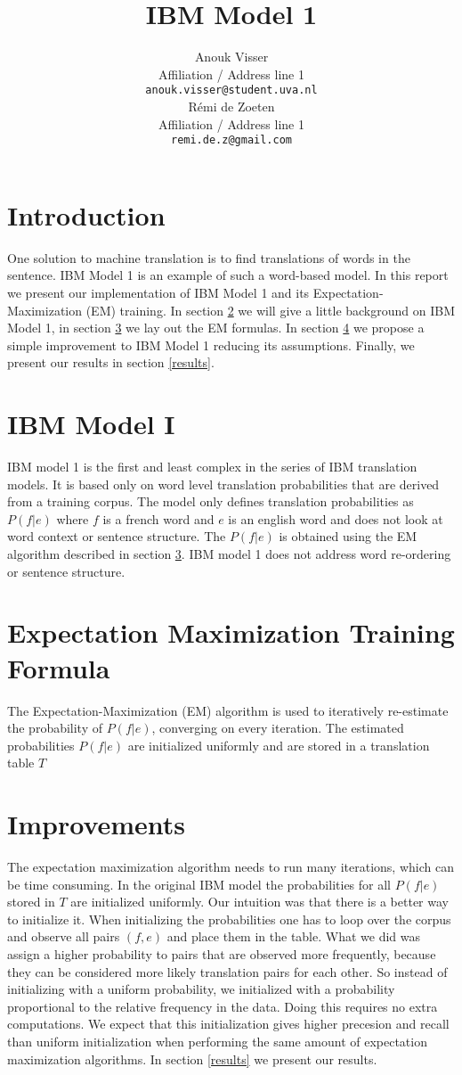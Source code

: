 \documentclass[11pt]{article}
\title{IBM Model 1}
\author{Anouk Visser \\
  Affiliation / Address line 1 \\
  {\tt anouk.visser@student.uva.nl} \\\And
  R\'emi de Zoeten \\
  Affiliation / Address line 1 \\
  {\tt remi.de.z@gmail.com} \\}
\date{}
\begin{document}
\maketitle

\section{Introduction}
One solution to machine translation is to find translations of words in the sentence. IBM Model 1 is an example of such a word-based model. In this report we present our implementation of IBM Model 1 and its Expectation-Maximization (EM) training. In section \ref{IBM} we will give a little background on IBM Model 1, in section \ref{em} we lay out the EM formulas. In section \ref{own} we propose a simple improvement to IBM Model 1 reducing its assumptions. Finally, we present our results in section \ref{results}.


\section{IBM Model I}
\label{IBM}
IBM model 1 is the first and least complex in the series of IBM translation models. It is based only on word level translation probabilities that are derived from a training corpus. The model only defines translation probabilities as $P(f|e)$ where $f$ is a french word and $e$ is an english word and does not look at word context or sentence structure. The $P(f|e)$ is obtained using the EM algorithm described in section \ref{em}. IBM model 1 does not address word re-ordering or sentence structure.

\section{Expectation Maximization Training Formula}
\label{em}
The Expectation-Maximization (EM) algorithm is used to iteratively re-estimate the probability of $P(f|e)$, converging on every iteration. The estimated probabilities $P(f|e)$ are initialized uniformly and are stored in a translation table $T$

\section{Improvements}
\label{own}
The expectation maximization algorithm needs to run many iterations, which can be time consuming. In the original IBM model the probabilities for all $P(f|e)$ stored in $T$ are initialized uniformly. Our intuition was that there is a better way to initialize it. When initializing the probabilities one has to loop over the corpus and observe all pairs $(f,e)$ and place them in the table. What we did was assign a higher probability to pairs that are observed more frequently, because they can be considered more likely translation pairs for each other. So instead of initializing with a uniform probability, we initialized with a probability proportional to the relative frequency in the data. Doing this requires no extra computations. We expect that this initialization gives higher precesion and recall than uniform initialization when performing the same amount of expectation maximization algorithms. In section \ref{results} we present our results.
\end{document}

